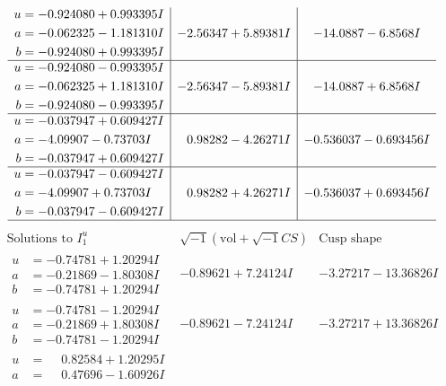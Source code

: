 \documentclass[1p]{elsarticle_modified}
\theoremstyle{definition}
\newcommand{\I}{\sqrt{-1}}
\begin{document}
$$\begin{array}{c|c|c}
\begin{aligned}
u &= -0.924080 + 0.993395 I \\
a &= -0.062325 - 1.181310 I \\
b &= -0.924080 + 0.993395 I\end{aligned}
 & -2.56347 + 5.89381 I & -14.0887 - 6.8568 I \\ \hline\begin{aligned}
u &= -0.924080 - 0.993395 I \\
a &= -0.062325 + 1.181310 I \\
b &= -0.924080 - 0.993395 I\end{aligned}
 & -2.56347 - 5.89381 I & -14.0887 + 6.8568 I \\ \hline\begin{aligned}
u &= -0.037947 + 0.609427 I \\
a &= -4.09907 - 0.73703 I \\
b &= -0.037947 + 0.609427 I\end{aligned}
 & \phantom{-}0.98282 - 4.26271 I & -0.536037 - 0.693456 I \\ \hline\begin{aligned}
u &= -0.037947 - 0.609427 I \\
a &= -4.09907 + 0.73703 I \\
b &= -0.037947 - 0.609427 I\end{aligned}
 & \phantom{-}0.98282 + 4.26271 I & -0.536037 + 0.693456 I\\
 \hline 
 \end{array}$$\newpage$$\begin{array}{c|c|c}  
\text{Solutions to }I^u_{1}& \I (\text{vol} + \sqrt{-1}CS) & \text{Cusp shape}\\
 \hline 
\begin{aligned}
u &= -0.74781 + 1.20294 I \\
a &= -0.21869 - 1.80308 I \\
b &= -0.74781 + 1.20294 I\end{aligned}
 & -0.89621 + 7.24124 I & -3.27217 - 13.36826 I \\ \hline\begin{aligned}
u &= -0.74781 - 1.20294 I \\
a &= -0.21869 + 1.80308 I \\
b &= -0.74781 - 1.20294 I\end{aligned}
 & -0.89621 - 7.24124 I & -3.27217 + 13.36826 I \\ \hline\begin{aligned}
u &= \phantom{-}0.82584 + 1.20295 I \\
a &= \phantom{-}0.47696 - 1.60926 I \\

\end{aligned}
\end{array}$$
\end{document}

